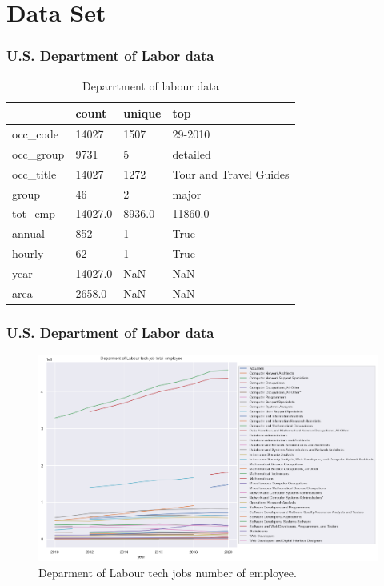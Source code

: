 \documentclass[10pt,mathserif]{beamer}
\begin{document}
\section{Data Set}
	\begin{frame}
	\frametitle{U.S. Department of Labor data}
	
	\begin{table}[h!]
		\caption{Deparrtment of  labour data }
		\resizebox{\columnwidth}{!}
		{%
			
			\begin{tabular}{llll}
				\hline
				{} &    count &  unique &                     top \\
				\hline
				occ\_code   &    14027 &    1507 &                 29-2010 \\
				occ\_group  &     9731 &       5 &                detailed \\
				occ\_title  &    14027 &    1272 &  Tour and Travel Guides \\
				group      &       46 &       2 &                   major \\
				tot\_emp    &  14027.0 &  8936.0 &                 11860.0 \\
				annual     &      852 &       1 &                    True \\
				hourly     &       62 &       1 &                    True \\
				year       &  14027.0 &     NaN &                     NaN \\
				area       &   2658.0 &     NaN &                     NaN \\
				\hline
			\end{tabular}
			
		}
	\end{table}
\end{frame}
	\begin{frame}
	\frametitle{U.S. Department of Labor data}
	\begin{figure}[h]
		\begin{center}
			\includegraphics[width=\linewidth]{./photos/totaltech.png}
		\end{center}
		\caption{Deparment of Labour tech jobs number of employee.}
		\label{dolnumofemployee}
	\end{figure}
\end{frame}
\end{document}
